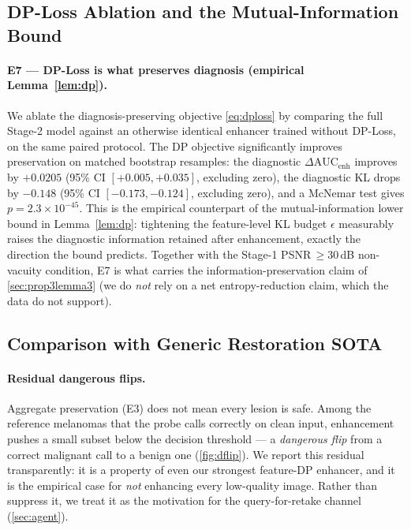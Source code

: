 \subsection{DP-Loss Ablation and the Mutual-Information Bound}\label{sec:exp-dploss}
\paragraph{E7 --- DP-Loss is what preserves diagnosis (empirical Lemma~\ref{lem:dp}).}
We ablate the diagnosis-preserving objective \eqref{eq:dploss} by comparing the full Stage-2 model
against an otherwise identical enhancer trained without DP-Loss, on the same paired protocol. The DP
objective significantly improves preservation on matched bootstrap resamples: the diagnostic
$\Delta\mathrm{AUC}_{\text{enh}}$ improves by $+0.0205$ (95\% CI $[+0.005,+0.035]$, excluding zero),
the diagnostic KL drops by $-0.148$ (95\% CI $[-0.173,-0.124]$, excluding zero), and a McNemar test
gives $p=2.3\times10^{-45}$. This is the empirical counterpart of the mutual-information lower bound in
Lemma~\ref{lem:dp}: tightening the feature-level KL budget $\epsilon$ measurably raises the diagnostic
information retained after enhancement, exactly the direction the bound predicts. Together with the
Stage-1 PSNR$\,\geq30$\,dB non-vacuity condition, E7 is what carries the information-preservation claim
of \cref{sec:prop3lemma3} (we do \emph{not} rely on a net entropy-reduction claim, which the data do
not support).

\subsection{Comparison with Generic Restoration SOTA}\label{sec:exp-sota}


\paragraph{Residual dangerous flips.}
Aggregate preservation (E3) does not mean every lesion is safe. Among the reference melanomas that the
probe calls correctly on clean input, enhancement pushes a small subset below the decision threshold ---
a \emph{dangerous flip} from a correct malignant call to a benign one (\cref{fig:dflip}). We report
this residual transparently: it is a property of even our strongest feature-DP enhancer, and it is the
empirical case for \emph{not} enhancing every low-quality image. Rather than suppress it, we treat it as
the motivation for the query-for-retake channel (\cref{sec:agent}).

